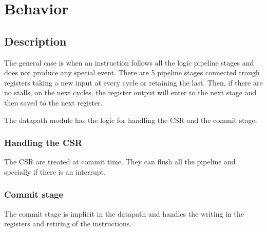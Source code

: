 \section{Behavior}

\subsection{Description}
The general case is when an instruction follows all the logic pipeline stages and does not produce any special event. There are 5 pipeline stages connected trough registers taking a new input at every cycle or retaining the last. Then, if there are no stalls, on the next cycles, the register output will enter to the next stage and then saved to the next register.

The datapath module has the logic for handling the CSR and the commit stage.

\subsubsection{Handling the CSR}
The CSR are treated at commit time. They can flush all the pipeline and specially if there is an interrupt. 

\subsubsection{Commit stage}
The commit stage is implicit in the datapath and handles the writing in the registers and retiring of the instructions.



